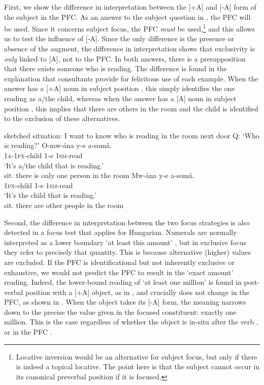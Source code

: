 \documentclass[output=paper]{langsci/langscibook}
\begin{document}
  First, we show the difference in interpretation between the [+A] and [-A] form of the subject in the PFC. As an answer to the subject question in , the PFC will be used. Since it concerns subject focus, the PFC \textit{must} be used,\footnote{Locative inversion would be an alternative for subject focus, but only if there is indeed a topical locative. The point here is that the subject cannot occur in its canonical preverbal position if it is focused.} and this allows us to test the influence of [-A]. Since the only difference is the presence or absence of the augment, the difference in interpretation shows that exclusivity is \textit{only} linked to [A], not to the PFC. In both answers, there is a presupposition that there exists someone who is reading. The difference is found in the explanation that consultants provide for felicitous use of each example. When the answer has a [+A] noun in subject position , this simply identifies the one reading as a/the child, whereas when the answer has a [A] noun in subject position , this implies that there are others in the room and the child is identified to the exclusion of these alternatives.

\ea\label{ex:vanderwal:39}
{sketched situation: I want to know who is reading in the room next door}
\glt   Q: ‘Who is reading?’
\ea\label{ex:vanderwal:39a}
\gll    O-mw-ána  y-e  a-somâ.\\
         \textsc{1a}-\textsc{1px}-child  1-e  \textsc{1sm}-read\\
\glt     ‘It’s a/the child that is reading.’\\
sit. there is only one person in the room
\ex\label{ex:vanderwal:39b}
\gll    Mw-ána  y-e  a-somâ.\\
         \textsc{1px}-child  1-e  \textsc{1sm}-read\\
\glt   ‘It’s the child that is reading.’\\
sit. there are other people in the room
\z
\z

Second, the difference in interpretation between the two focus strategies is also detected in a focus test that \citet{Kiss2009} applies for Hungarian. Numerals are normally interpreted as a lower boundary ‘at least this amount’ \citep{Horn1972,Levinson2000}, but in exclusive focus they refer to precisely that quantity. This is because alternative (higher) values are excluded. If the PFC is identificational but not inherently exclusive or exhaustive, we would not predict the PFC to result in the ‘exact amount’ reading. Indeed, the lower-bound reading of ‘at least one million’ is found in post-verbal position with a [+A] object, as in , and crucially does not change in the PFC, as shown in . When the object takes its [-A] form, the meaning narrows down to the precise the value given in the focused constituent: exactly one million. This is the case regardless of whether the object is in-situ after the verb , or in the PFC .
\end{document}
